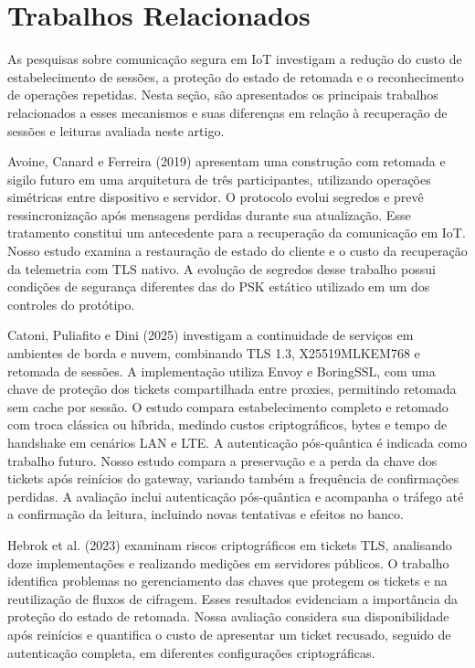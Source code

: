 \section{Trabalhos Relacionados}
\label{sec:related}

As pesquisas sobre comunicação segura em IoT investigam a redução do custo de estabelecimento de sessões, a proteção do estado de retomada e o reconhecimento de operações repetidas. Nesta seção, são apresentados os principais trabalhos relacionados a esses mecanismos e suas diferenças em relação à recuperação de sessões e leituras avaliada neste artigo.

Avoine, Canard e Ferreira (2019) \cite{avoine2019iotfriendly} apresentam uma construção com retomada e sigilo futuro em uma arquitetura de três participantes, utilizando operações simétricas entre dispositivo e servidor. O protocolo evolui segredos e prevê ressincronização após mensagens perdidas durante sua atualização. Esse tratamento constitui um antecedente para a recuperação da comunicação em IoT. Nosso estudo examina a restauração de estado do cliente e o custo da recuperação da telemetria com TLS nativo. A evolução de segredos desse trabalho possui condições de segurança diferentes das do PSK estático utilizado em um dos controles do protótipo.

Catoni, Puliafito e Dini (2025) \cite{catoni2025continuity} investigam a continuidade de serviços em ambientes de borda e nuvem, combinando TLS 1.3, X25519MLKEM768 e retomada de sessões. A implementação utiliza Envoy e BoringSSL, com uma chave de proteção dos tickets compartilhada entre proxies, permitindo retomada sem cache por sessão. O estudo compara estabelecimento completo e retomado com troca clássica ou híbrida, medindo custos criptográficos, bytes e tempo de handshake em cenários LAN e LTE. A autenticação pós-quântica é indicada como trabalho futuro. Nosso estudo compara a preservação e a perda da chave dos tickets após reinícios do gateway, variando também a frequência de confirmações perdidas. A avaliação inclui autenticação pós-quântica e acompanha o tráfego até a confirmação da leitura, incluindo novas tentativas e efeitos no banco.

Hebrok et al. (2023) \cite{hebrok2023tickets} examinam riscos criptográficos em tickets TLS, analisando doze implementações e realizando medições em servidores públicos. O trabalho identifica problemas no gerenciamento das chaves que protegem os tickets e na reutilização de fluxos de cifragem. Esses resultados evidenciam a importância da proteção do estado de retomada. Nossa avaliação considera sua disponibilidade após reinícios e quantifica o custo de apresentar um ticket recusado, seguido de autenticação completa, em diferentes configurações criptográficas.

